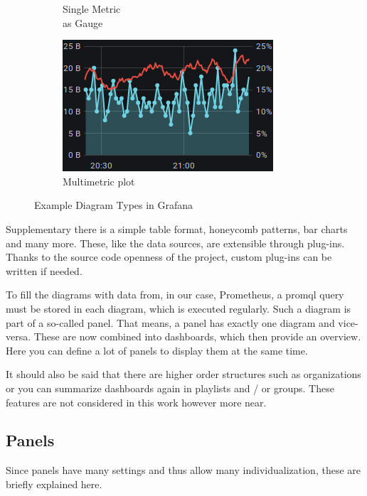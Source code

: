 \begin{figure}[ht]
\begin{subfigure}{.25\textwidth}
		\captionsetup{justification=centering}
		\caption{Single Metric\\as Gauge}
		\label{fig:sfig2}
	\end{subfigure}%
	\begin{subfigure}{.5\textwidth}
		\centering
		\includegraphics[width=.8\linewidth]{assets/screenshots/Screenshot_2020-12-08 Grafana Play Home - Grafana(2).png}
		\captionsetup{justification=centering}
		\caption{Multimetric plot}
		\label{fig:sfig2}
	\end{subfigure}
	\caption{Example Diagram Types in Grafana}
	\label{fig:fig}
\end{figure}
Supplementary there is a simple table format, honeycomb patterns, bar charts and many more. These, like the data sources, are extensible through plug-ins. Thanks to the source code openness of the project, custom plug-ins can be written if needed.

To fill the diagrams with data from, in our case, Prometheus, a \gls{promql} query must be stored in each diagram, which is executed regularly. Such a diagram is part of a so-called panel. That means, a panel has exactly one diagram and vice-versa. These are now combined into dashboards, which then provide an overview. Here you can define a lot of panels to display them at the same time.

It should also be said that there are higher order structures such as organizations or you can summarize dashboards again in playlists and / or groups. These features are not considered in this work however more near.

\subsection{Panels}
Since panels have many settings and thus allow many individualization, these are briefly explained here.

